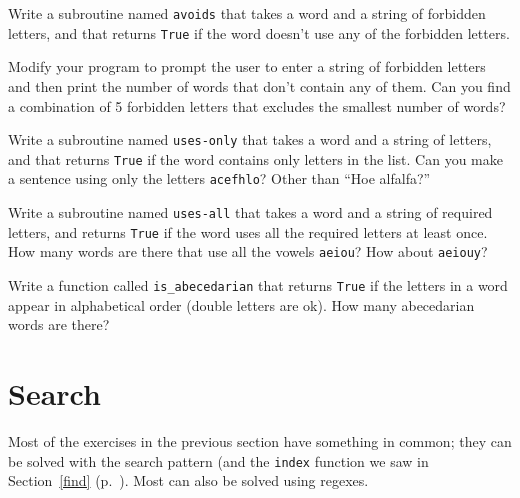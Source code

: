 \begin{exercise} 

Write a subroutine named {\tt avoids}
that takes a word and a string of forbidden letters, and
that returns {\tt True} if the word doesn't use any of 
the forbidden letters.

Modify your program to prompt the user to enter a string
of forbidden letters and then print the number of words that
don't contain any of them.
Can you find a combination of 5 forbidden letters that
excludes the smallest number of words?

\end{exercise}



\begin{exercise}

Write a subroutine named \verb"uses-only" that takes a word and a
string of letters, and that returns {\tt True} if the word contains
only letters in the list.  Can you make a sentence using only the
letters {\tt acefhlo}?  Other than ``Hoe alfalfa?''

\end{exercise}


\begin{exercise} 

Write a subroutine named \verb"uses-all" that takes a word and a
string of required letters, and returns {\tt True} if the word
uses all the required letters at least once.  How many words are there
that use all the vowels {\tt aeiou}?  How about {\tt aeiouy}?

\end{exercise}


\begin{exercise}

Write a function called \verb"is_abecedarian" that returns
{\tt True} if the letters in a word appear in alphabetical order
(double letters are ok).  
How many abecedarian words are there?


\end{exercise}



\section{Search}
\label{search}

Most of the exercises in the previous section have something
in common; they can be solved with the search pattern (and 
the {\tt index} function we saw in Section~\ref{find} 
(p.~\pageref{find}). Most can also be solved using regexes.

